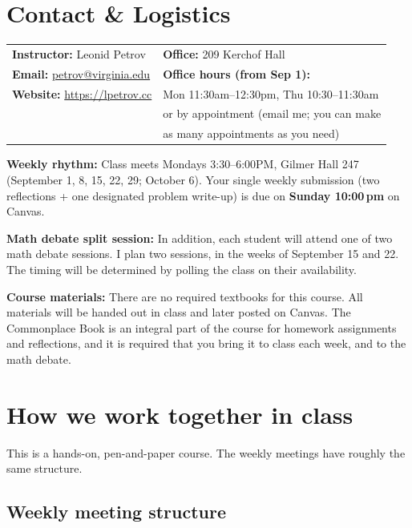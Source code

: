 \documentclass[oneside,11pt]{amsart}
\begin{document}
\newpage
\section{Contact \& Logistics}

\noindent
\begin{tabular}{ll}
\textbf{Instructor:} Leonid Petrov &\qquad \qquad \qquad\textbf{Office:} 209 Kerchof Hall \\
\textbf{Email:} \href{mailto:petrov@virginia.edu}{petrov@virginia.edu} & \qquad \qquad \qquad\textbf{Office hours (from Sep 1):} \\
\textbf{Website:} \url{https://lpetrov.cc}
& \qquad \qquad \qquad Mon 11:30am--12:30pm, Thu 10:30--11:30am \\
& \qquad \qquad \qquad or by appointment (email me; you can make \\
& \qquad \qquad \qquad as many appointments as you need)
\end{tabular}

\smallskip
\noindent\textbf{Weekly rhythm:} Class meets Mondays
3:30--6:00PM, Gilmer Hall 247
(September 1, 8, 15, 22, 29; October 6).
Your single weekly submission (two reflections + one designated problem write-up) is due on \textbf{Sunday 10:00\,pm} on Canvas.

\smallskip
\noindent
\textbf{Math debate split session:}
In addition, each student will attend one of two math debate sessions. I plan two
sessions, in the weeks of September 15 and 22. The timing will be
determined by polling the class on their availability.

\smallskip
\noindent
\textbf{Course materials:}
There are no required textbooks for this course.
All materials will be handed out in class and later posted on Canvas.
The Commonplace Book is an integral part of the course for homework assignments and reflections,
and it is required that you bring it to class each week, and to the math debate.

\section{How we work together in class}

This is a hands-on, pen-and-paper course.
The weekly meetings have roughly the same structure.

\subsection{Weekly meeting structure}
\end{document}
